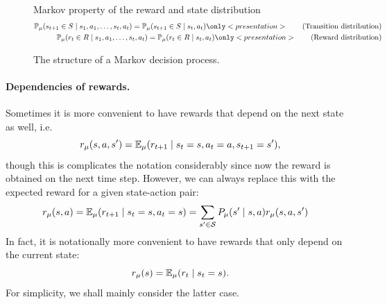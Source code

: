 \begin{figure}[ht]
      \begin{center}
      \end{center}
  \begin{block}{Markov property of the reward and state distribution}
    \begin{align}
      \Pr_\mdp(s_{t+1} \in S \mid s_1, a_1, \ldots, s_t, a_t) = \Pr_\mdp(s_{t+1} \in S \mid s_t, a_t)  \only<presentation>{\tag{Transition distribution}}
      \\
      \Pr_\mdp(r_{t} \in R \mid s_1, a_1, \ldots, s_t, a_t) = \Pr_\mdp(r_{t} \in R \mid s_t, a_t) \only<presentation>{\tag{Reward distribution}}
    \end{align}
  \end{block}
  \caption{The structure of a Markov decision process.}
  \label{fig:MDP}
\end{figure}


\paragraph{Dependencies of rewards.}
Sometimes it is more convenient to have rewards that depend on the next state as well, i.e.
\begin{equation}
  \label{eq:next-state-dependent-rewards}
  r_\mu(s,a,s') = \mathop{\mbox{\ensuremath{\mathbb{E}}}}\nolimits_\mu(r_{t+1} \mid s_t = s, a_t = a, s_{t+1} = s'),
\end{equation}
though this is complicates the notation considerably since now the reward is obtained on the next time step. However, we can always replace this with the expected reward for a given state-action pair:
\begin{align}
  \label{eq:expected-reward-state-action}
  r_\mu(s, a)
  &= \mathop{\mbox{\ensuremath{\mathbb{E}}}}\nolimits_\mu(r_{t+1} \mid s_t = s, a_t = s)
  = \sum_{s' \in {\mathcal{S}}} P_\mu(s' \mid s, a) r_\mu(s, a, s')
\end{align}
In fact, it is notationally more convenient to have rewards that only depend on the current state:
\begin{equation}
  \label{eq:state-dependent-rewards}
  r_\mu(s) = \mathop{\mbox{\ensuremath{\mathbb{E}}}}\nolimits_\mu(r_{t} \mid s_t = s).
\end{equation}
For simplicity, we shall mainly consider the latter case. 

